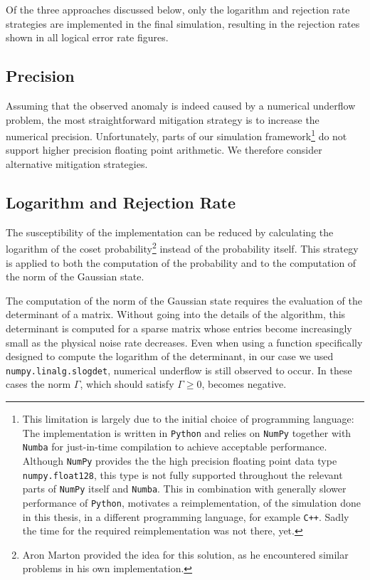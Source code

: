 Of the three approaches discussed below, only the logarithm and rejection rate strategies are implemented in the final simulation,
resulting in the rejection rates shown in all logical error rate figures. 

\subsection{Precision}
Assuming that the observed anomaly is indeed caused by a numerical underflow problem, the most straightforward mitigation strategy is to increase the numerical precision. 
Unfortunately, parts of our simulation framework\footnote{
    This limitation is largely due to the initial choice of programming language: The implementation is written in \texttt{Python} and relies on \texttt{NumPy} \cite{numpy} together with \texttt{Numba} \cite{numba} for just-in-time compilation to achieve acceptable performance. 
    Although \texttt{NumPy} provides the the high precision floating point data type \texttt{numpy.float128}, 
    this type is not fully supported throughout the relevant parts of \texttt{NumPy} itself and \texttt{Numba}.
    This in combination with generally slower performance of \texttt{Python}, motivates a reimplementation, of the simulation done in this thesis, in a different programming language, for example \texttt{C++}.
    Sadly the time for the required reimplementation was not there, yet.
} do not support higher precision floating point arithmetic. 
We therefore consider alternative mitigation strategies. 

\subsection{Logarithm and Rejection Rate}

The susceptibility of the implementation can be reduced by calculating the logarithm of the coset probability\footnote{
    Aron Marton provided the idea for this solution, as he encountered similar problems in his own implementation.
} instead of the probability itself.
This strategy is applied to both the computation of the probability and to the computation of the norm of the Gaussian state. 

The computation of the norm of the Gaussian state requires the evaluation of the determinant of a matrix.
Without going into the details of the algorithm, this determinant is computed for a sparse matrix whose entries become increasingly small as the physical noise rate decreases.
Even when using a function specifically designed to compute the logarithm of the determinant, in our case we used \texttt{numpy.linalg.slogdet}, 
numerical underflow is still observed to occur. 
In these cases the norm $\Gamma$, which should satisfy $\Gamma \geq 0$, becomes negative.

